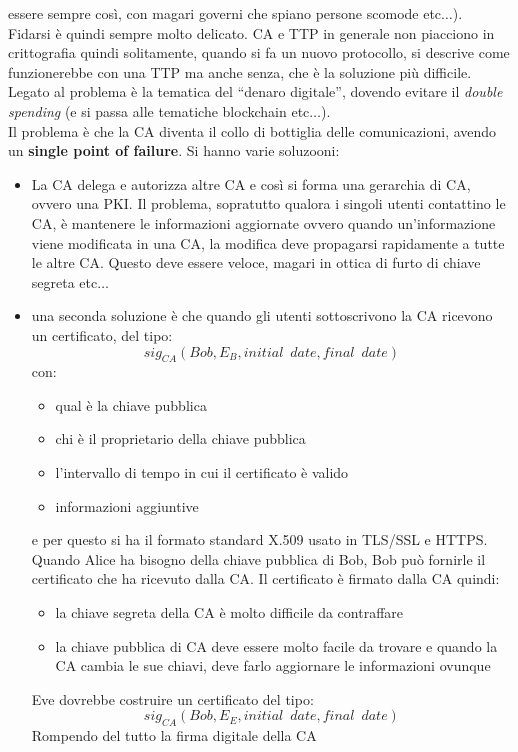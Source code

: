 \documentclass[a4paper,12pt, oneside]{book}
\begin{document}
essere sempre così, con magari governi che spiano persone scomode
etc$\ldots$). \\ 
Fidarsi è quindi sempre molto delicato. CA e TTP in generale non piacciono in
crittografia quindi solitamente, quando si fa un nuovo protocollo, si descrive
come funzionerebbe con una TTP ma anche senza, che è la soluzione più
difficile. Legato al problema è la tematica del ``denaro digitale'', dovendo
evitare il \textit{double spending} (e si passa alle tematiche blockchain
etc$\ldots$).\\   
Il problema è che la CA diventa il collo di bottiglia delle comunicazioni,
avendo un \textbf{single point of failure}. Si hanno varie soluzooni:
\begin{itemize}
  \item La CA delega e autorizza altre CA e così si forma una gerarchia di CA,
  ovvero una PKI. Il problema, sopratutto qualora i singoli utenti contattino le
  CA, è mantenere le informazioni aggiornate ovvero quando
  un'informazione viene modificata in una CA, la modifica deve propagarsi
  rapidamente a tutte le altre CA. Questo deve essere veloce, magari in ottica
  di furto di chiave segreta etc$\ldots$
  \item una seconda soluzione è che quando gli utenti sottoscrivono la CA
  ricevono un certificato, del tipo:
  \[sig_{CA}(Bob, E_B, initial\,\,\, date, final\,\,\, date)\]
  con:
  \begin{itemize}
    \item qual è la chiave pubblica
    \item chi è il proprietario della chiave pubblica
    \item l'intervallo di tempo in cui il certificato è valido 
    \item informazioni aggiuntive
  \end{itemize}
  e per questo si ha il formato standard X.509 usato in TLS/SSL e HTTPS. Quando
  Alice ha bisogno della chiave pubblica di Bob, Bob può fornirle il certificato
  che ha ricevuto dalla CA. Il certificato è firmato dalla CA quindi:
  \begin{itemize}
    \item la chiave segreta della CA è molto difficile da contraffare
    \item la chiave pubblica di CA deve essere molto facile da trovare e quando
    la CA cambia le sue chiavi, deve farlo aggiornare le informazioni ovunque  
  \end{itemize}
  Eve dovrebbe costruire un certificato del tipo:
  \[sig_{CA}(Bob, E_E, initial\,\,\, date, final\,\,\, date)\]
  Rompendo del tutto la firma digitale della CA
\end{itemize}
\end{document}

